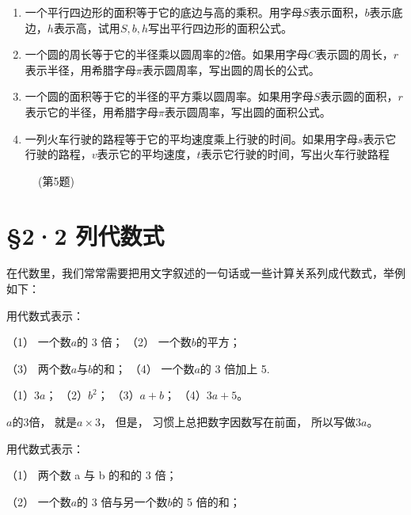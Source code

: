\begin{enumerate}[start=4]
\item
  一个平行四边形的面积等于它的底边与高的乘积。用字母\(S\)表示面积，\(b\)表示底边，\(h\)表示高，试用\(S, b, h\)写出平行四边形的面积公式。
\item
  一个圆的周长等于它的半径乘以圆周率的2倍。如果用字母\(C\)表示圆的周长，\(r\)表示半径，用希腊字母\(\pi\)表示圆周率，写出圆的周长的公式。
\item
  一个圆的面积等于它的半径的平方乘以圆周率。如果用字母\(S\)表示圆的面积，\(r\)表示它的半径，用希腊字母\(\pi\)表示圆周率，写出圆的面积公式。
\item
  一列火车行驶的路程等于它的平均速度乘上行驶的时间。如果用字母\(s\)表示它行驶的路程，\(v\)表示它的平均速度，\(t\)表示它行驶的时间，写出火车行驶路程
\end{enumerate}


\begin{figure}
\centering
\caption{(第5题)}
\end{figure}


\section{§2·2 列代数式}

在代数里，我们常常需要把用文字叙述的一句话或一些计算关系列成代数式，举例如下：

 用代数式表示：

（1） 一个数\(a\)的 3 倍； （2） 一个数\(b\)的平方；

（3） 两个数\(a\)与\(b\)的和； （4） 一个数\(a\)的 3 倍加上 5.

 （1）\(3a\)； （2）\(b^{2}\)； （3）\(a + b\)；
（4）\(3a + 5\)。

\(a\)的3倍， 就是\(a \times 3\)， 但是，
习惯上总把数字因数写在前面， 所以写做\(3a\)。

 用代数式表示：

（1） 两个数 a 与 b 的和的 3 倍；

（2） 一个数\(a\)的 3 倍与另一个数\(b\)的 5 倍的和；

